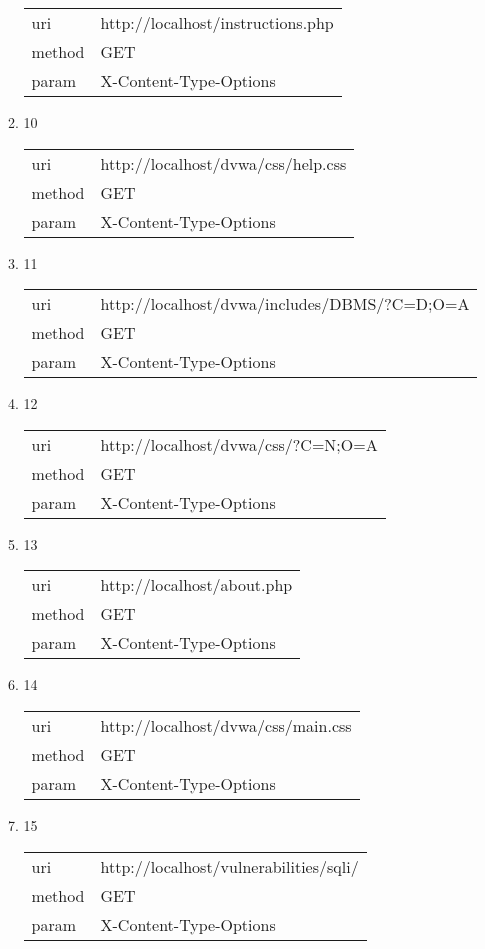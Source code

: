 \documentclass[10pt]{article}
\begin{document}
\begin{itemize}
\begin{enumerate}
\begin{tabular}{| l | p{12cm}}
uri & http://localhost/instructions.php \\
method & GET \\
param & X-Content-Type-Options \\
\end{tabular}
\item[] 10
\begin{tabular}{| l | p{12cm}}
uri & http://localhost/dvwa/css/help.css \\
method & GET \\
param & X-Content-Type-Options \\
\end{tabular}
\item[] 11
\begin{tabular}{| l | p{12cm}}
uri & http://localhost/dvwa/includes/DBMS/?C=D;O=A \\
method & GET \\
param & X-Content-Type-Options \\
\end{tabular}
\item[] 12
\begin{tabular}{| l | p{12cm}}
uri & http://localhost/dvwa/css/?C=N;O=A \\
method & GET \\
param & X-Content-Type-Options \\
\end{tabular}
\item[] 13
\begin{tabular}{| l | p{12cm}}
uri & http://localhost/about.php \\
method & GET \\
param & X-Content-Type-Options \\
\end{tabular}
\item[] 14
\begin{tabular}{| l | p{12cm}}
uri & http://localhost/dvwa/css/main.css \\
method & GET \\
param & X-Content-Type-Options \\
\end{tabular}
\item[] 15
\begin{tabular}{| l | p{12cm}}
uri & http://localhost/vulnerabilities/sqli/ \\
method & GET \\
param & X-Content-Type-Options \\
\end{tabular}

\end{enumerate}
\end{itemize}
\end{document}
